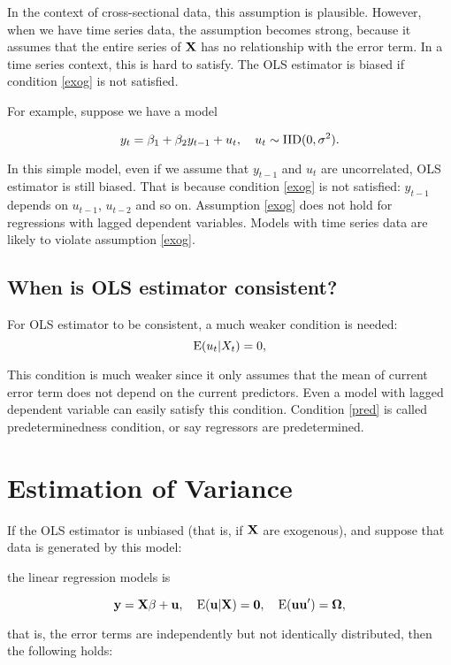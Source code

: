 In the context of cross-sectional data, this assumption is plausible.
However, when we have time series data, the assumption becomes strong,
because it assumes that the entire series of $\bf X$ has no
relationship with the error term.  In a time series context, this is
hard to satisfy.  The OLS estimator is biased if condition \ref{exog}
is not satisfied.

For example, suppose we have a model  

\[ y_t = \beta_1 + \beta_2 y_{t-1} + u_t, \quad u_t \sim {\rm IID} (0, \sigma^2). \]

In this simple model, even if we assume that $y_{t-1}$ and $u_t$ are
uncorrelated, OLS estimator is still biased.  That is because
condition \ref{exog} is not satisfied: $y_{t-1}$ depends on $u_{t-1}$,
$u_{t-2}$ and so on.  Assumption \ref{exog} does not hold for
regressions with lagged dependent variables.  Models with time series
data are likely to violate assumption \ref{exog}.


\subsection{When is OLS estimator consistent?}

For OLS estimator to be consistent, a much weaker condition is needed: 
\begin{equation}
{\rm E} (u_t|X_t)=0,
\label{pred}
\end{equation}

This condition is much weaker since it only assumes that the mean of
current error term does not depend on the current predictors.  Even a
model with lagged dependent variable can easily satisfy this
condition.  Condition \ref{pred} is called predeterminedness
condition, or say regressors are predetermined.


\section{Estimation of Variance}

If the OLS estimator is unbiased (that is, if $\bf X$ are exogenous),
and suppose that data is generated by this model:

the linear regression models is

\begin{equation}
\bf y=X\beta+u, \quad {\rm E} (u | X)=0, \quad {\rm E} (u u')=\Omega,
\end{equation}


that is, the error terms are independently but not identically
distributed, then the following holds:

